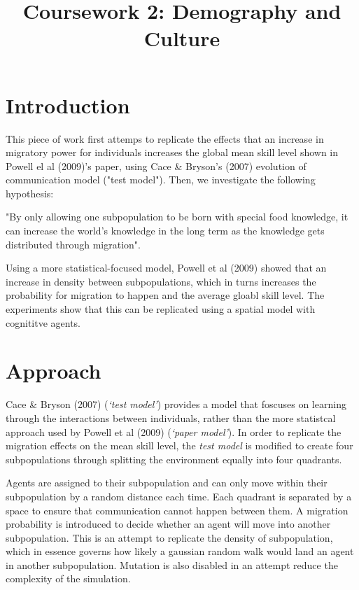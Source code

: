 \documentclass[a4paper,12pt]{article}
\title{Coursework 2: Demography and Culture}
\begin{document}
\maketitle

\section{Introduction}
This piece of work first attemps to replicate the effects that an increase in migratory power for individuals increases the global mean skill level shown in Powell el al (2009)'s paper, using Cace \& Bryson's (2007) evolution of communication model ("test model"). Then, we investigate the following hypothesis:

\begin{center}
    "By only allowing one subpopulation to be born with special food knowledge, it can increase the world's knowledge in the long term as the knowledge gets distributed through migration".
\end{center}

Using a more statistical-focused model, Powell et al (2009) showed that an increase in density between subpopulations, which in turns increases the probability for migration to happen and the average gloabl skill level. The experiments show that this can be replicated using a spatial model with cognititve agents. 


\section{Approach}
Cace \& Bryson (2007) (\textit{`test model'}) provides a model that foscuses on learning through the interactions between individuals, rather than the more statistcal approach used by Powell et al (2009) (\textit{`paper model'}). In order to replicate the migration effects on the mean skill level, the \textit{test model} is modified to create four subpopulations through splitting the environment equally into four quadrants. 

Agents are assigned to their subpopulation and can only move within their subpopulation by a random distance each time. Each quadrant is separated by a space to ensure that communication cannot happen between them. A migration probability is introduced to decide whether an agent will move into another subpopulation. This is an attempt to replicate the density of subpopulation, which in essence governs how likely a gaussian random walk would land an agent in another subpopulation. Mutation is also disabled in an attempt reduce the complexity of the simulation.
\end{document}
